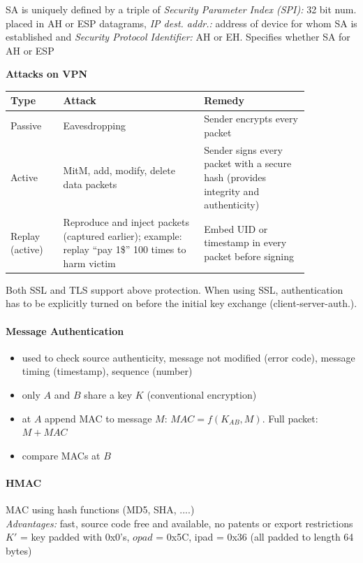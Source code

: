 SA is uniquely defined by a triple of \emph{Security Parameter Index (SPI):} 32 bit num. placed in AH or ESP datagrams, \emph{IP dest. addr.:} address of device for whom SA is established and \emph{Security Protocol Identifier:} AH or EH. Specifies whether SA for AH or ESP

\textbf{Attacks on VPN}

\begin{tabular}{p{0.15\linewidth}p{0.4\linewidth}p{0.3\linewidth}}
Type & Attack & Remedy \\
\hline
\hline
Passive & Eavesdropping & Sender encrypts every packet \\
\hline
Active & MitM, add, modify, delete data packets & Sender signs every packet with a secure hash (provides integrity and authenticity)\\
\hline
Replay (active) & Reproduce and inject packets (captured earlier); example: replay ``pay 1\$'' 100 times to harm victim & Embed UID or timestamp in every packet before signing
\end{tabular}

Both SSL and TLS support above protection. When using SSL, authentication has to be explicitly turned on before the initial key exchange (client-server-auth.).

\paragraph{Message Authentication} 
\begin{itemize}
\item used to check source authenticity, message not modified (error code), message timing (timestamp), sequence (number)
\item only $A$ and $B$ share a key $K$ (conventional encryption) 
\item at $A$ append MAC to message $M$: $MAC = f(K_{AB}, M)$. Full packet: $M + MAC$
\item compare MACs at $B$
\end{itemize}

\paragraph{HMAC} MAC using hash functions (MD5, SHA, ....) \\ \emph{Advantages:} fast, source code free and available, no patents or export restrictions
$K'$ = key padded with 0x0's, $opad$ = 0x5C, ipad = 0x36 (all padded to length 64 bytes)


